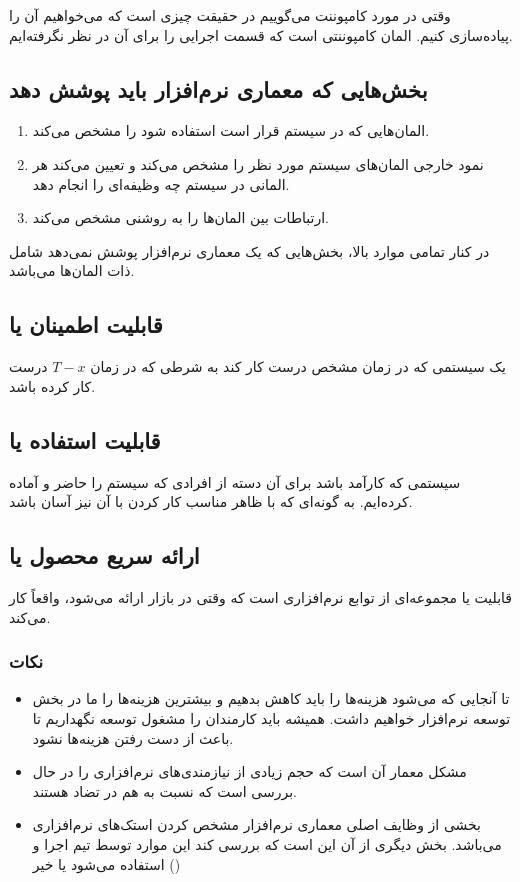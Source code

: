 وقتی در مورد کامپوننت می‌گوییم در حقیقت چیزی است که می‌خواهیم آن را پیاده‌سازی
کنیم. المان کامپوننتی است که قسمت اجرایی را برای آن در نظر نگرفته‌ایم.

\subsection{بخش‌هایی که معماری نرم‌افزار باید پوشش دهد}

\begin{enumerate}
    \item المان‌هایی که در سیستم قرار است استفاده شود را مشخص می‌کند.
    \item نمود خارجی المان‌های سیستم مورد نظر را مشخص می‌کند و تعیین می‌کند هر
    المانی در سیستم چه وظیفه‌ای را انجام دهد.
    \item ارتباطات بین المان‌ها را به روشنی مشخص می‌کند.
\end{enumerate}

در کنار تمامی موارد بالا، بخش‌هایی که یک معماری نرم‌افزار پوشش نمی‌دهد شامل ذات
المان‌ها می‌باشد.

\subsection{قابلیت اطمینان یا }

یک سیستمی که در زمان مشخص درست کار کند به شرطی که در زمان $T - x$ درست کار کرده
باشد.

\subsection{قابلیت استفاده یا }

سیستمی که کارآمد باشد برای آن دسته از افرادی که سیستم را حاضر و آماده کرده‌ایم.
به گونه‌ای که با ظاهر مناسب کار کردن با آن نیز آسان باشد.

\subsection{ارائه سریع محصول یا }

قابلیت یا  مجموعه‌ای از توابع نرم‌افزاری است که وقتی در بازار ارائه
می‌شود، واقعاً کار می‌کند. 

\subsubsection*{نکات}

\begin{itemize}
    \item تا آنجایی که می‌شود هزینه‌ها را باید کاهش بدهیم و بیشترین هزینه‌ها را
    ما در بخش توسعه نرم‌افزار خواهیم داشت. همیشه باید کارمندان را مشغول توسعه
    نگهداریم تا باعث از دست رفتن هزینه‌ها نشود.
    \item مشکل معمار آن است که حجم زیادی از نیازمندی‌های نرم‌افزاری را در حال
    بررسی است که نسبت به هم در تضاد هستند.
    \item بخشی از وظایف اصلی معماری نرم‌افزار مشخص کردن استک‌های نرم‌افزاری
    می‌باشد. بخش دیگری از آن این است که بررسی کند این موارد توسط تیم اجرا و
    استفاده می‌شود یا خیر ()
\end{itemize}


